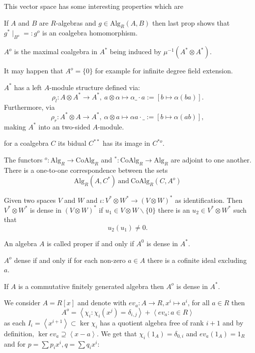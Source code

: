 \bmk This vector space has some interesting properties which are
\bn
\item If $A$ and $B$ are $R$-algebras and $g \in \mathrm{Alg}_R(A,B)$ then last prop shows that $g^\ast \mid_{B^o} =: g^o$ is an coalgebra homomorphism.
\item $A^o$ is the maximal coalgebra in $A^\ast$ being induced by $\mu^{-1}(A^\ast \otimes A^\ast)$.
\item It may happen that $A^o = \{0\}$ for example for infinite degree field extension.
\item $A^\ast$ has a left $A$-module structure defined via:
$$\rho_l : A \otimes A^\ast \longrightarrow A^\ast,\ a \otimes \alpha \longmapsto \alpha \_ \cdot a := [b \longmapsto \alpha(b a)].$$
Furthermore, via
$$\rho_r : A^\ast \otimes A \longrightarrow A^\ast,\ \alpha \otimes a \longmapsto \alpha a \cdot \_ := [b \longmapsto \alpha(a b)],$$
making $A^\ast$ into an two-sided $A$-module.
\item for a coalgebra $C$ its bidual $C^{\ast \ast}$ has its image in $C^{\ast o}$.
\en
\begin{satz}
The functors $^o : \mathrm{Alg}_R \longrightarrow \mathrm{CoAlg}_R$ and $^* : \mathrm{CoAlg}_R \longrightarrow \mathrm{Alg}_R$ are adjoint to one another. There is a one-to-one correspondence between the sets
$$\mathrm{Alg}_R(A,C^\ast) \ \mathrm{and}\ \mathrm{CoAlg}_R(C, A^o)$$
\end{satz}
Given two spaces $V$ and $W$ and $\iota : V^\ast \otimes W^\ast \longrightarrow (V \otimes W)^\ast$ as identification. Then $V^\ast \otimes W^\ast$ is dense in $(V \otimes W)^\ast$ if $u_1 \in V \otimes W\backslash\{0\}$ there is an $u_2 \in V^\ast \otimes W^\ast$ such that
$$u_2(u_1) \neq 0.$$
\begin{defi}
An algebra $A$ is called proper if and only if $A^0$ is dense in $A^\ast$.
\end{defi}
\begin{lemm}
$A^o$ dense if and only if for each non-zero $a \in A$ there is a cofinite ideal excluding $a$.
\end{lemm}
\begin{satz}
If $A$ is a commutative finitely generated algebra then $A^o$ is dense in $A^\ast$.
\end{satz}
\bsp We consider $A = R[x]$ and denote with $ev_a : A \longrightarrow R, x^i \longmapsto a^i$, for all $a \in R$ then
$$A^o = \left<\chi_i : \chi_i(x^j) = \delta_{i,j}\right> + \left<ev_a : a \in R \right>$$
as each $I_i = \left<x^{i+1}\right> \subset \ker\chi_i$ has a quotient algebra free of rank $i + 1$ and by definition, $\ker ev_a \supseteq \left<x - a\right>$. We get that $\chi_i(1_A) = \delta_{0,i}$ and $ev_a(1_A) = 1_R$ and for $p = \sum p_i x^i, q = \sum q_i x^i$:
